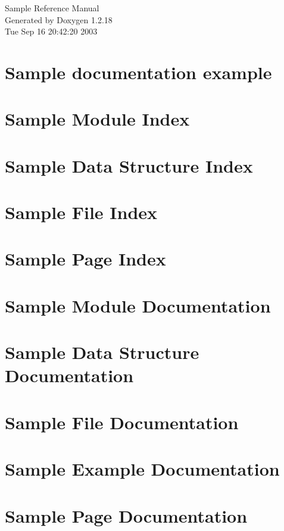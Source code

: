 \documentclass[a4paper]{book}
\begin{document}
\begin{titlepage}
\vspace*{7cm}
\begin{center}
{\Large Sample Reference Manual}\\
\vspace*{1cm}
{\large Generated by Doxygen 1.2.18}\\
\vspace*{0.5cm}
{\small Tue Sep 16 20:42:20 2003}\\
\end{center}
\end{titlepage}
\clearemptydoublepage
{}
\tableofcontents
\clearemptydoublepage
{}
\chapter{Sample documentation example}
\label{index}\hypertarget{index}{}
\chapter{Sample Module Index}

\chapter{Sample Data Structure Index}

\chapter{Sample File Index}

\chapter{Sample Page Index}

\chapter{Sample Module Documentation}

\chapter{Sample Data Structure Documentation}

\chapter{Sample File Documentation}


\chapter{Sample Example Documentation}

\chapter{Sample Page Documentation}




\printindex
\end{document}

